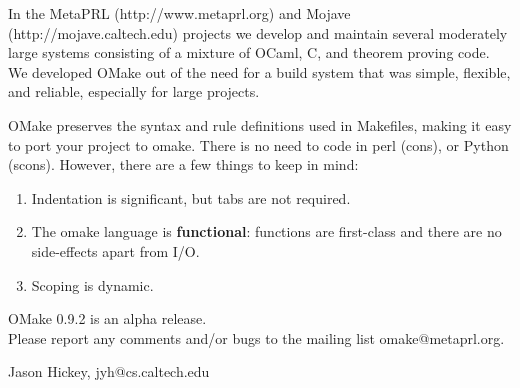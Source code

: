 \documentclass[12pt]{article}
\begin{document}
In the MetaPRL ({\sf http://www.metaprl.org}) and Mojave
({\sf http://mojave.caltech.edu}) projects we develop and maintain several
moderately large systems consisting of a mixture of OCaml, C, and
theorem proving code.  We developed OMake out of the need for a build
system that was simple, flexible, and reliable, especially for large
projects.

OMake preserves the syntax and rule definitions used in Makefiles,
making it easy to port your project to omake.  There is no need to
code in perl (cons), or Python (scons).  However, there are a few
things to keep in mind:

\begin{enumerate}
\item Indentation is significant, but tabs are not required.
\item The omake language is {\bf functional}: functions are first-class
      and there are no side-effects apart from I/O.
\item Scoping is dynamic.
\end{enumerate}

\noindent
OMake 0.9.2 is an alpha release.\\
Please report any comments and/or bugs to the mailing
list {\sf omake@metaprl.org}.
\vfill

\noindent
{\tiny Jason Hickey, {\sf jyh@cs.caltech.edu}}
\end{document}
